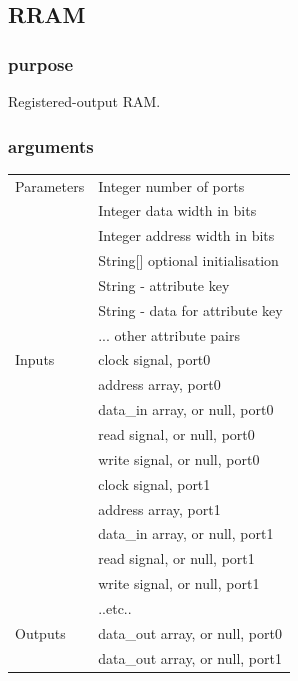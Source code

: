 \documentclass[10pt,a4paper,twoside,fleqn]{book}
\begin{document}
            \subsection{RRAM}

                \subsubsection{purpose}

                    Registered-output RAM.

                \subsubsection{arguments}

                    \begin{tabular}{| l | l |}
                    \hline
                    Parameters  & Integer number of ports \\
                                & Integer data width in bits \\
                                & Integer address width in bits \\
                                & String[] optional initialisation \\
                                & String - attribute key \\
                                & String - data for attribute key \\
                                &       ...     other attribute pairs \\
                    \hline
                    Inputs      & clock signal, port0 \\
                                & address array, port0 \\
                                & data\_in array, or null, port0 \\
                                & read signal, or null, port0 \\
                                & write signal, or null, port0 \\
                                & clock signal, port1 \\
                                & address array, port1 \\
                                & data\_in array, or null, port1 \\
                                & read signal, or null, port1 \\
                                & write signal, or null, port1 \\
                                & ..etc.. \\
                    \hline
                    Outputs     & data\_out array, or null, port0 \\
                                & data\_out array, or null, port1 \\
                    \hline
                    \end{tabular}
\end{document}
